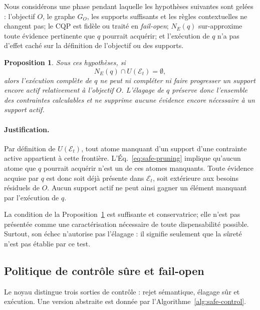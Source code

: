 \documentclass[journal]{IEEEtran}
\newtheorem{proposition}{Proposition}
\begin{document}
Nous considérons une phase pendant laquelle les hypothèses suivantes sont gelées : l'objectif $O$, le graphe $G_O$, les supports suffisants et les règles contextuelles ne changent pas; le CQP est fidèle ou traité en \emph{fail-open}; $N_E(q)$ sur-approxime toute évidence pertinente que $q$ pourrait acquérir; et l'exécution de $q$ n'a pas d'effet caché sur la définition de l'objectif ou des supports.

\begin{proposition}
\label{prop:safe-pruning}
Sous ces hypothèses, si
\begin{equation}
\label{eq:safe-pruning}
N_E(q)\cap U(\mathcal{E}_t)=\emptyset,
\end{equation}
alors l'exécution complète de $q$ ne peut ni compléter ni faire progresser un support encore actif relativement à l'objectif $O$. L'élagage de $q$ préserve donc l'ensemble des contraintes calculables et ne supprime aucune évidence encore nécessaire à un support actif.
\end{proposition}

\paragraph*{Justification.}
Par définition de $U(\mathcal{E}_t)$, tout atome manquant d'un support d'une contrainte active appartient à cette frontière. L'Éq.~\eqref{eq:safe-pruning} implique qu'aucun atome que $q$ pourrait acquérir n'est un de ces atomes manquants. Toute évidence acquise par $q$ est donc soit déjà présente dans $\mathcal{E}_t$, soit extérieure aux besoins résiduels de $O$. Aucun support actif ne peut ainsi gagner un élément manquant par l'exécution de $q$.

La condition de la Proposition~\ref{prop:safe-pruning} est suffisante et conservatrice; elle n'est pas présentée comme une caractérisation nécessaire de toute dispensabilité possible. Surtout, son échec n'autorise pas l'élagage : il signifie seulement que la sûreté n'est pas établie par ce test.

\subsection{Politique de contrôle sûre et fail-open}

Le noyau distingue trois sorties de contrôle : rejet sémantique, élagage sûr et exécution. Une version abstraite est donnée par l'Algorithme~\ref{alg:safe-control}.
\end{document}
